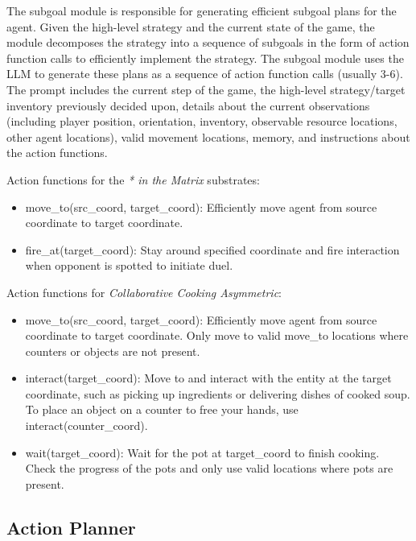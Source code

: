 \documentclass{article} %
\begin{document}
The subgoal module is responsible for generating efficient subgoal plans for the agent. Given the high-level strategy and the current state of the game, the module decomposes the strategy into a sequence of subgoals in the form of action function calls to efficiently implement the strategy. The subgoal module uses the LLM to generate these plans as a sequence of action function calls (usually 3-6). The prompt includes the current step of the game, the high-level strategy/target inventory previously decided upon, details about the current observations (including player position, orientation, inventory, observable resource locations, other agent locations), valid movement locations, memory, and instructions about the action functions.

Action functions for the \textit{* in the Matrix} substrates:

\begin{itemize}
    \item move\_to(src\_coord, target\_coord): Efficiently move agent from source coordinate to target coordinate.
    \item fire\_at(target\_coord): Stay around specified coordinate and fire interaction when opponent is spotted to initiate duel.
\end{itemize}

Action functions for \textit{Collaborative Cooking Asymmetric}:

\begin{itemize}
    \item move\_to(src\_coord, target\_coord): Efficiently move agent from source coordinate to target coordinate. Only move to valid move\_to locations where counters or objects are not present.
    \item interact(target\_coord): Move to and interact with the entity at the target coordinate, such as picking up ingredients or delivering dishes of cooked soup. To place an object on a counter to free your hands, use interact(counter\_coord).
    \item wait(target\_coord): Wait for the pot at target\_coord to finish cooking. Check the progress of the pots and only use valid locations where pots are present.
\end{itemize}


\subsection{Action Planner}
\end{document}
